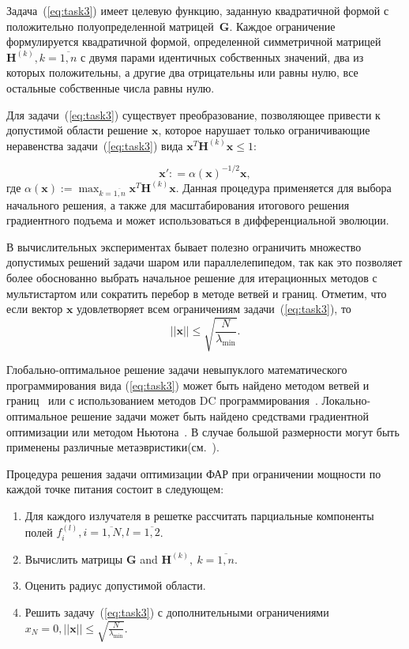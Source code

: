 Задача~(\ref{eq:task3}) имеет целевую функцию, заданную квадратичной формой с положительно полуопределенной матрицей~$\textbf{G}$. Каждое ограничение формулируется квадратичной формой, определенной симметричной матрицей~$\textbf{H}^{(k)}, k=\overline{1,n}$ с двумя парами идентичных собственных значений, два из которых положительны, а другие два отрицательны или равны нулю, все остальные собственные числа равны нулю.

Для задачи~(\ref{eq:task3}) существует преобразование, позволяющее привести к допустимой области решение $\textbf{x}$, которое нарушает только ограничивающие неравенства задачи~(\ref{eq:task3}) вида $\textbf{x}^{T}\textbf{H}^{(k)}\textbf{x} \leq 1$:

\begin{equation}
    \textbf{x}': =\alpha(\textbf{x})^{-1/2} \textbf{x} ,
    \label{eq:scale}
\end{equation}
где $\alpha(\textbf{x}):=\max_{k=\overline{1,n}} \textbf{x}^T \textbf{H}^{(k)}\textbf{x}$. Данная процедура применяется для выбора начального решения, а также для масштабирования итогового решения градиентного подъема и может использоваться  в дифференциальной эволюции.

В вычислительных экспериментах бывает полезно ограничить множество допустимых решений задачи шаром или параллелепипедом, так как это позволяет более обоснованно выбрать начальное решение для итерационных методов с мультистартом или сократить перебор в методе ветвей и границ. Отметим, что если вектор $\textbf{x}$ удовлетворяет всем ограничениям задачи~(\ref{eq:task3}), то
\begin{equation} \label{eqn:bound}
||\textbf{x}||\le \sqrt{\frac{N}{\lambda_{\min}}}.
\end{equation}

Глобально-оптимальное решение задачи невыпуклого математического программирования вида (\ref{eq:task3}) может быть найдено методом
ветвей и границ~ или с использованием методов DC программирования~. Локально-оптимальное решение задачи может быть найдено средствами градиентной оптимизации или методом Ньютона~. В случае большой размерности могут быть применены различные метаэвристики(см.~).

Процедура решения задачи оптимизации ФАР при ограничении мощности по каждой точке питания состоит в следующем:
%
\begin{enumerate}
  \item Для каждого излучателя в решетке рассчитать парциальные компоненты полей $f_i^{(l)}, i= \overline{1,N}, l=\overline{1,2}$.
  \item Вычислить матрицы $\textbf{G}$ and ${\textbf{H}}^{(k)},\ k=\overline{1,n}$.
  \item Оценить радиус допустимой области.
  \item Решить задачу~(\ref{eq:task3}) с дополнительными ограничениями $x_N = 0, ||\textbf{x}||\le \sqrt{\frac{N}{\lambda_{\min}}}$.
\end{enumerate}

